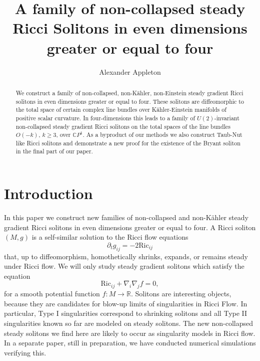 \documentclass{amsart}
\theoremstyle{definition}
\theoremstyle{remark}
\numberwithin{equation}{section}
\newcommand{\R}{\mathbb{R}}  %
\begin{document}
\title[A family of non-collapsed steady Ricci Solitons]{A family of non-collapsed steady Ricci Solitons in even dimensions greater or equal to four}
\author{Alexander Appleton}
\address{Department of Mathematics, UC Berkeley, 
CA 94720, USA}
\maketitle

\begin{abstract}
We construct a family of non-collapsed, non-K\"ahler, non-Einstein steady gradient Ricci solitons in even dimensions greater or equal to four. These solitons are diffeomorphic to the total space of certain complex line bundles over K\"ahler-Einstein manifolds of positive scalar curvature. In four-dimensions this leads to a family of $U(2)$-invariant non-collapsed steady gradient Ricci solitons on the total spaces of the line bundles $O(-k)$, $k \geq 3$, over $\mathbb{C}P^1$. As a byproduct of our methods we also construct Taub-Nut like Ricci solitons and demonstrate a new proof for the existence of the Bryant soliton in the final part of our paper.
\end{abstract}

\tableofcontents

\section{Introduction}
In this paper we construct new families of non-collapsed and non-K\"ahler steady gradient Ricci solitons in even dimensions greater or equal to four. A Ricci soliton $(M,g)$ is a self-similar solution to the Ricci flow equations 
\begin{equation}
\label{ricciflow}
\partial_t g_{ij} = -2\mathrm{Ric}_{ij} 
\end{equation}
that, up to diffeomorphism, homothetically shrinks, expands, or remains steady under Ricci flow. We will only study steady gradient solitons which satisfy the equation
\begin{equation}
\label{soliton}
\mathrm{Ric}_{ij} + \nabla_i \nabla_j f = 0,
\end{equation}
for a smooth potential function $f: M \rightarrow \R$. Solitons are interesting objects, because they are candidates for blow-up limits of singularities in Ricci Flow. In particular, Type I singularities correspond to shrinking solitons and all Type II singularities known so far are modeled on steady solitons. The new non-collapsed steady solitons we find here are likely to occur as singularity models in Ricci flow. In a separate paper, still in preparation, we have conducted numerical simulations verifying this. 
\end{document}
